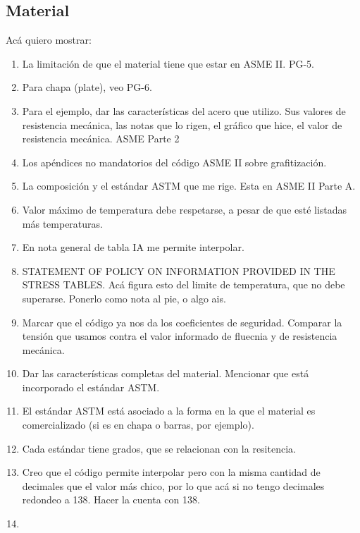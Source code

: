 \subsection{Material}

Acá quiero mostrar:

\begin{enumerate}
     \item La limitación de que el material tiene que estar en ASME II. PG-5.
     \item Para chapa (plate), veo PG-6.
     \item Para el ejemplo, dar las características del acero que utilizo. Sus valores de resistencia mecánica, las notas que lo rigen, el gráfico que hice, el valor de resistencia mecánica. ASME Parte 2
     \item Los apéndices no mandatorios del código ASME II sobre grafitización.
     \item La composición y el estándar ASTM que me rige. Esta en ASME II Parte A.
     \item Valor máximo de temperatura debe respetarse, a pesar de que esté listadas más temperaturas.
     \item En nota general de tabla IA me permite interpolar.
     \item STATEMENT OF POLICY ON INFORMATION PROVIDED IN THE STRESS TABLES. Acá figura esto del limite de temperatura, que no debe superarse. Ponerlo como nota al pie, o algo ais.
     \item Marcar que el código ya nos da los coeficientes de seguridad. Comparar la tensión que usamos contra el valor informado de fluecnia y de resistencia mecánica.
     \item Dar las características completas del material. Mencionar que está incorporado el estándar ASTM.
     \item El estándar ASTM está asociado a la forma en la que el material es comercializado (si es en chapa o barras, por ejemplo).
     \item Cada estándar tiene grados, que se relacionan con la resitencia.
     \item Creo que el código permite interpolar pero con la misma cantidad de decimales que el valor más chico, por lo que acá si no tengo decimales redondeo a 138. Hacer la cuenta con 138.
     \item 
\end{enumerate}

